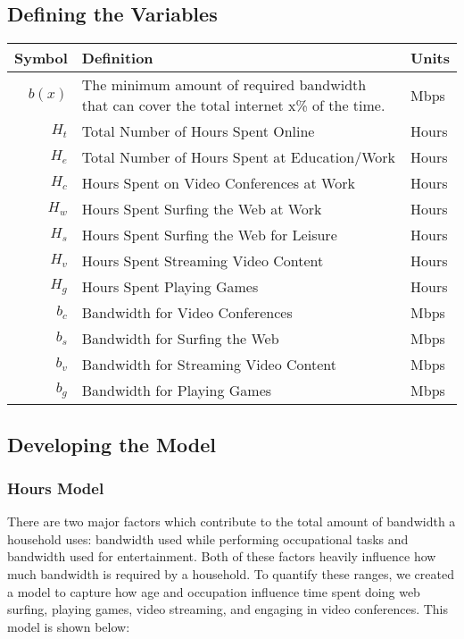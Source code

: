\documentclass[12pt]{article}
\begin{document}
\subsection{Defining the Variables}
\begin{tabular}{|r|p{4.15in}|p{1.2in}|}
\hline
\textbf{Symbol} & \textbf{Definition} & \textbf{Units}
\\
\hline
$b(x)$ & The minimum amount of required bandwidth that can cover the total internet x\% of the time.  & Mbps
\\
\hline
$H_t$ & Total Number of Hours Spent Online & Hours
\\
\hline
$H_e$ & Total Number of Hours Spent at Education/Work & Hours
\\
\hline
$H_c$ & Hours Spent on Video Conferences at Work & Hours
\\
\hline
$H_w$ & Hours Spent Surfing the Web at Work & Hours
\\
\hline
$H_s$ & Hours Spent Surfing the Web for Leisure & Hours
\\
\hline
$H_v$ & Hours Spent Streaming Video Content & Hours
\\
\hline
$H_g$ & Hours Spent Playing Games & Hours
\\
\hline
$b_c$ & Bandwidth for Video Conferences & Mbps
\\
\hline
$b_s$ & Bandwidth for Surfing the Web & Mbps
\\
\hline
$b_v$ & Bandwidth for Streaming Video Content & Mbps
\\
\hline
$b_g$ & Bandwidth for Playing Games & Mbps
\\
\hline
\end{tabular}

\subsection{Developing the Model}

\subsubsection{Hours Model}
There are two major factors which contribute to the total amount of bandwidth a household uses: bandwidth used while performing occupational tasks and bandwidth used for entertainment. Both of these factors heavily influence how much bandwidth is required by a household. To quantify these ranges, we created a model to capture how age and occupation influence time spent doing web surfing, playing games, video streaming, and engaging in video conferences. This model is shown below:
\end{document}

